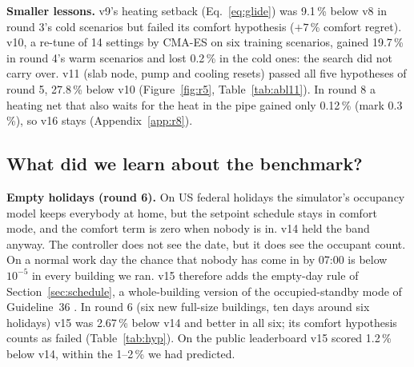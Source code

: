 \documentclass{article}
\begin{document}
\textbf{Smaller lessons.} v9's heating setback (Eq.~\ref{eq:glide}) was 9.1\,\% below v8 in round 3's cold scenarios
but failed its comfort hypothesis ($+7$\,\% comfort regret). v10, a re-tune of 14 settings by CMA-ES
\cite{hansen2001cma} on six training scenarios, gained 19.7\,\% in round 4's warm scenarios and lost 0.2\,\% in the cold
ones: the search did not carry over. v11 (slab node, pump and cooling resets) passed all five hypotheses of round 5,
27.8\,\% below v10 (Figure~\ref{fig:r5}, Table~\ref{tab:abl11}). In round 8 a heating net that also waits for the heat
in the pipe gained only 0.12\,\% (mark 0.3\,\%), so v16 stays (Appendix~\ref{app:r8}).

\subsection{What did we learn about the benchmark?}\label{sec:bench}\label{sec:holiday}\label{sec:big}
\textbf{Empty holidays (round 6).} On US federal holidays the simulator's occupancy model keeps everybody at home, but
the setpoint schedule stays in comfort mode, and the comfort term is zero when nobody is in. v14 held the band anyway.
The controller does not see the date, but it does see the occupant count. On a normal work day the
chance that nobody has come in by 07:00 is below $10^{-5}$ in every building we ran. v15 therefore adds the empty-day rule of Section~\ref{sec:schedule}, a whole-building
version of the occupied-standby mode of Guideline~36 \cite{ashrae2021g36}. In round 6 (six new
full-size buildings, ten days around six holidays) v15 was 2.67\,\% below v14 and better in all six; its comfort
hypothesis counts as failed (Table~\ref{tab:hyp}). On the public leaderboard v15 scored 1.2\,\% below v14, within the 1--2\,\% we had
predicted.
\end{document}
